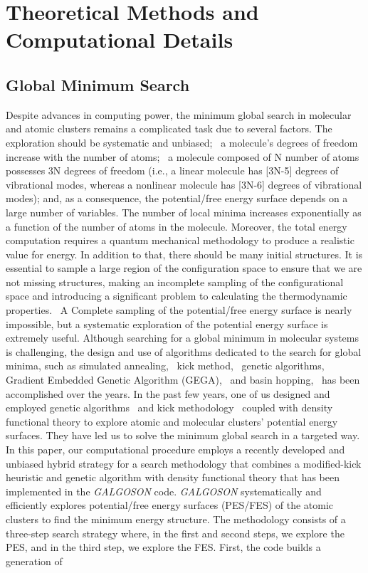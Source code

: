 \documentclass[prb,aps,preprint,showkeys,showpacs]{revtex4}
\begin{document}
\section{Theoretical Methods and Computational Details} 
\subsection{Global Minimum Search}
Despite advances in computing power, the minimum global search in molecular and atomic clusters remains a complicated task due to several factors. The exploration should be systematic and unbiased;~\cite{Min,Baletto} a molecule's degrees of freedom increase with the number of atoms;~\cite{Baletto,Wille_1985,Xu,Rossi_2009,Cheng} a molecule composed of N number of atoms possesses 3N degrees of freedom (i.e., a linear molecule has [3N-5]  degrees of vibrational modes, whereas a nonlinear molecule has [3N-6] degrees of vibrational modes); and, as a consequence, the potential/free energy surface depends on a large number of variables. The number of local minima increases exponentially as a function of the number of atoms in the molecule. Moreover, the total energy computation requires a quantum mechanical methodology to produce a realistic value for energy. In addition to that, there should be many initial structures. It is essential to sample a large region of the configuration space to ensure that we are not missing structures, making an incomplete sampling of the configurational space and introducing a significant problem to calculating the thermodynamic properties.~\cite{Zhen} A Complete sampling of the potential/free energy surface is nearly impossible, but a systematic exploration of the potential energy surface is extremely useful. Although searching for a global minimum in molecular systems is challenging, the design and use of algorithms dedicated to the search for global minima, such as simulated annealing,~\cite{kirkpatrick, metropolis, xiang, yang, vlachos, granville} kick method,~\cite{Saunders,Saunders2} genetic algorithms,~\cite{hsu, Wei, goldberg} Gradient Embedded Genetic Algorithm (GEGA),~\cite{alexa, alexandrova, alexan} and basin hopping,~\cite{harding, wales} has been accomplished over the years. In the past few years, one of us designed and employed genetic algorithms~\cite{Guo,Dong,Mondal,Ravell,Grande-Aztatzi} and kick methodology~\cite{Sudip,Cui,Vargas-Caamal2,Vargas-Caamal,Cui2,Vargas-Caamal2015,Florez,Ravell} coupled with density functional theory to explore atomic and molecular clusters' potential energy surfaces. They have led us to solve the minimum global search in a targeted way. In this paper, our computational procedure employs a recently developed and unbiased hybrid strategy for a search methodology that combines a modified-kick heuristic and genetic algorithm with density functional theory that has been implemented in the \emph{GALGOSON} code. \emph{GALGOSON} systematically and efficiently explores potential/free energy surfaces (PES/FES) of the atomic clusters to find the minimum energy structure. The methodology consists of a three-step search strategy where, in the first and second steps, we explore the PES, and in the third step, we explore the FES. First, the code builds a generation of 
\end{document}
